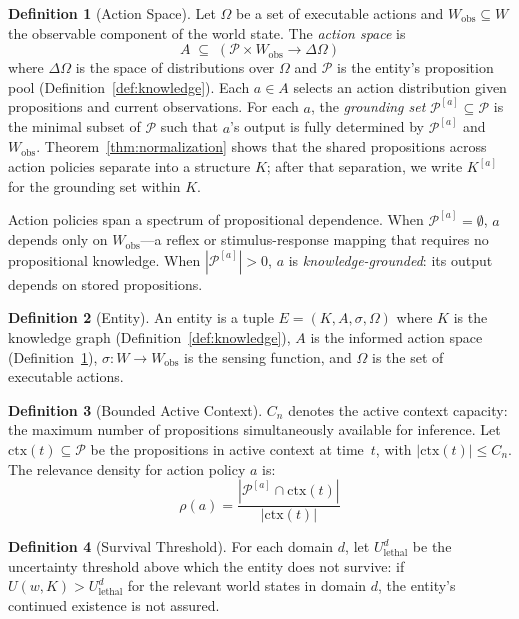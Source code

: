 \documentclass[11pt]{article}
\theoremstyle{definition}
\newtheorem{definition}{Definition}
\theoremstyle{remark}
\begin{document}
\begin{definition}[Action Space]
\label{def:action}
Let $\Omega$ be a set of executable actions and $W_{\text{obs}} \subseteq W$
the observable component of the world state. The \emph{action space} is
\[
A \;\subseteq\; (\mathcal{P} \times W_{\text{obs}} \to \Delta \Omega)
\]
where $\Delta \Omega$ is the space of distributions over $\Omega$ and
$\mathcal{P}$ is the entity's proposition pool
(Definition~\ref{def:knowledge}). Each $a \in A$ selects an action
distribution given propositions and current observations. For each $a$,
the \emph{grounding set} $\mathcal{P}^{[a]} \subseteq \mathcal{P}$ is
the minimal subset of $\mathcal{P}$ such that $a$'s output is fully
determined by $\mathcal{P}^{[a]}$ and $W_{\text{obs}}$.
Theorem~\ref{thm:normalization} shows that the shared propositions
across action policies separate into a structure $K$; after that
separation, we write $K^{[a]}$ for the grounding set within $K$.

Action policies span a spectrum of propositional dependence. When
$\mathcal{P}^{[a]} = \emptyset$, $a$ depends only on
$W_{\text{obs}}$---a reflex or stimulus-response mapping that requires
no propositional knowledge. When $|\mathcal{P}^{[a]}| > 0$, $a$ is
\emph{knowledge-grounded}: its output depends on stored propositions.
\end{definition}

\begin{definition}[Entity]
\label{def:entity}
An entity is a tuple $E = (K, A, \sigma, \Omega)$ where $K$ is the knowledge
graph (Definition~\ref{def:knowledge}), $A$ is the informed action space
(Definition~\ref{def:action}), $\sigma : W \to W_{\text{obs}}$ is the
sensing function, and $\Omega$ is the set of executable actions.
\end{definition}

\begin{definition}[Bounded Active Context]
\label{def:context}
$C_n$ denotes the active context capacity: the maximum number of
propositions simultaneously available for inference. Let
$\mathrm{ctx}(t) \subseteq \mathcal{P}$ be the propositions in active
context at time~$t$, with $|\mathrm{ctx}(t)| \leq C_n$. The relevance
density for action policy $a$ is:
\[
\rho(a) = \frac{|\mathcal{P}^{[a]} \cap \mathrm{ctx}(t)|}{|\mathrm{ctx}(t)|}
\]
\end{definition}

\begin{definition}[Survival Threshold]
\label{def:survival}
For each domain $d$, let $U_{\text{lethal}}^d$ be the uncertainty
threshold above which the entity does not survive: if $U(w, K) >
U_{\text{lethal}}^d$ for the relevant world states in domain $d$, the
entity's continued existence is not assured.
\end{definition}
\end{document}
